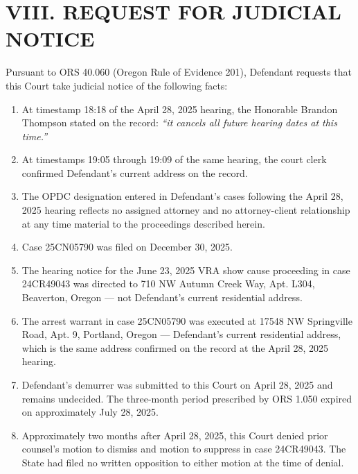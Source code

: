 \documentclass[12pt,letterpaper]{article}
\begin{document}

\section*{VIII. REQUEST FOR JUDICIAL NOTICE}

Pursuant to ORS 40.060 (Oregon Rule of Evidence 201), Defendant requests that
this Court take judicial notice of the following facts:

\begin{enumerate}[leftmargin=*, label=\arabic*., itemsep=4pt]

\item At timestamp 18:18 of the April 28, 2025 hearing, the Honorable Brandon
Thompson stated on the record: \textit{``it cancels all future hearing dates at
this time.''}

\item At timestamps 19:05 through 19:09 of the same hearing, the court clerk
confirmed Defendant's current address on the record.

\item The OPDC designation entered in Defendant's cases following the April 28,
2025 hearing reflects no assigned attorney and no attorney-client relationship
at any time material to the proceedings described herein.

\item Case 25CN05790 was filed on December 30, 2025.

\item The hearing notice for the June 23, 2025 VRA show cause proceeding in case
24CR49043 was directed to 710 NW Autumn Creek Way, Apt. L304, Beaverton, Oregon
--- not Defendant's current residential address.

\item The arrest warrant in case 25CN05790 was executed at 17548 NW Springville
Road, Apt. 9, Portland, Oregon --- Defendant's current residential address,
which is the same address confirmed on the record at the April 28, 2025 hearing.

\item Defendant's demurrer was submitted to this Court on April 28, 2025 and
remains undecided. The three-month period prescribed by ORS 1.050 expired on
approximately July 28, 2025.

\item Approximately two months after April 28, 2025, this Court denied prior
counsel's motion to dismiss and motion to suppress in case 24CR49043. The State
had filed no written opposition to either motion at the time of denial.


\end{enumerate}
\end{document}
